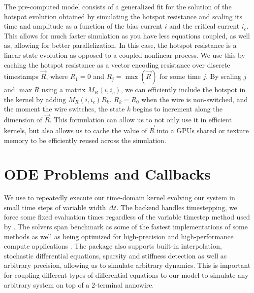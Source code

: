 The pre-computed model consists of a generalized fit for the solution of the hotspot evolution
obtained by simulating the hotspot resistance and scaling its time and amplitude as a function
of the bias current $i$ and the critical current $i_c$. This allows for much faster simulation as you have
less equations coupled, as well as, allowing for better parallelization. In this case, the
hotspot resistance is a linear state evolution as opposed to a coupled nonlinear process. We use
this by caching the hotspot resistance as a vector encoding resistance over discrete timestamps
$\vec R$, where $R_1=0$ and $R_{j} = \max(\vec R)$ for some time $j$. By scaling $j$ and $\max R$ using
a matrix $M_R(i, i_c)$, we can efficiently include the hotspot in the kernel by adding 
$M_R(i, i_c) R_k$. $R_k=R_0$ when the wire is non-switched, and the moment the wire switches,
the state $k$ begins to increment along the dimension of $\vec R$. This formulation can allow
us to not only use it in efficient kernels, but also allows us to cache the value of $\vec R$ 
into a GPUs shared or texture memory to be efficiently reused across the simulation.

\section{ODE Problems and Callbacks}

We use  to repeatedly execute our time-domain kernel evolving our
system in small time steps of variable width $\Delta t$. The  backend
handles timestepping, we force some fixed evaluation times regardless of the variable timestep
method used by . The  solvers span
benchmark as some of the fastest implementations of some methods as well as being optimized
for high-precision and high-performance compute applications \cite{differentialequationsjl, ODESolver-diffeq}.
The package also supports built-in interpolation, stochastic differential equations, sparsity and 
stiffness detection  as well as arbitrary precision, allowing us to simulate arbitrary dynamics. 
This is important for coupling different types of differential equations to our model to simulate
any arbitrary system on top of a 2-terminal nanowire.


